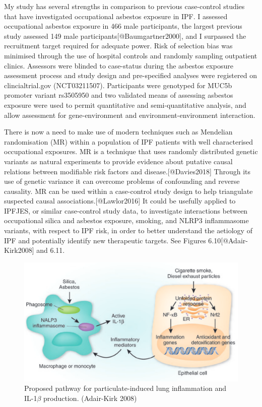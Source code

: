 My study has several strengths in comparison to previous case-control
studies that have investigated occupational asbestos exposure in IPF. I
assessed occupational asbestos exposure in 466 male participants, the
largest previous study assessed 149 male
participants{[}@Baumgartner2000{]}, and I surpassed the recruitment
target required for adequate power. Risk of selection bias was minimised
through the use of hospital controls and randomly sampling outpatient
clinics. Assessors were blinded to case-status during the asbestos
exposure assessment process and study design and pre-specified analyses
were registered on clincialtrial.gov (NCT03211507). Participants were
genotyped for MUC5b promoter variant rs3505950 and two validated means
of assessing asbestos exposure were used to permit quantitative and
semi-quantitative analysis, and allow assessment for gene-environment
and environment-environment interaction.

There is now a need to make use of modern techniques such as Mendelian
randomisation (MR) within a population of IPF patients with well
characterised occupational exposures. MR is a technique that uses
randomly distributed genetic variants as natural experiments to provide
evidence about putative causal relations between modifiable risk factors
and disease.{[}@Davies2018{]} Through its use of genetic variance it can
overcome problems of confounding and reverse causality. MR can be used
within a case-control study design to help triangulate suspected causal
associations.{[}@Lawlor2016{]} It could be usefully applied to IPFJES,
or similar case-control study data, to investigate interactions between
occupational silica and asbestos exposure, smoking, and NLRP3
inflammasome variants, with respect to IPF risk, in order to better
understand the aetiology of IPF and potentially identify new therapeutic
targets. See Figures 6.10{[}@Adair-Kirk2008{]} and 6.11.

\begin{figure}
\centering
\includegraphics{source/figures/asbestos_silica_smoking.png}
\caption{Proposed pathway for particulate-induced lung inflammation and
IL-1\ensuremath{\beta} production. (Adair-Kirk 2008)}
\end{figure}

